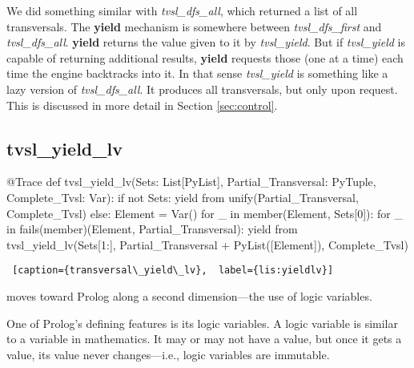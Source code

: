 We did something similar with \textit{tvsl\_dfs\_all}, which returned a list of all transversals. The \textbf{yield} mechanism is somewhere between \textit{tvsl\_dfs\_first} and \textit{tvsl\_dfs\_all}. \textbf{yield} returns the value given to it by \textit{tvsl\_yield}. But if \textit{tvsl\_yield} is capable of returning additional results, \textbf{yield} requests those (one at a time) each time the engine backtracks into it. In that sense \textit{tvsl\_yield} is something like a lazy version of \textit{tvsl\_dfs\_all}. It produces all transversals, but only upon request. This is discussed in more detail in Section \ref{sec:control}. 


\subsection{tvsl\_yield\_lv}

\begin{minipage}{\linewidth} \largev   \hrulefill
\begin{python}[numbers=left]
@Trace
def tvsl_yield_lv(Sets: List[PyList], Partial_Transversal: PyTuple, Complete_Tvsl: Var):
  if not Sets:
    yield from unify(Partial_Transversal, Complete_Tvsl)
  else:
    Element = Var()
    for _ in member(Element, Sets[0]):
      for _ in fails(member)(Element, Partial_Transversal):
        yield from tvsl_yield_lv(Sets[1:], Partial_Transversal + PyList([Element]), Complete_Tvsl)
\end{python}
\begin{lstlisting} [caption={transversal\_yield\_lv},  label={lis:yieldlv}]
\end{lstlisting}
\end{minipage}

\smallv

 moves toward Prolog along a second dimension---the use of logic variables.

One of Prolog's defining features is its logic variables. A logic variable is similar to a variable in mathematics. It may or may not have a value, but once it gets a value, its value never changes---i.e., logic variables are immutable.

